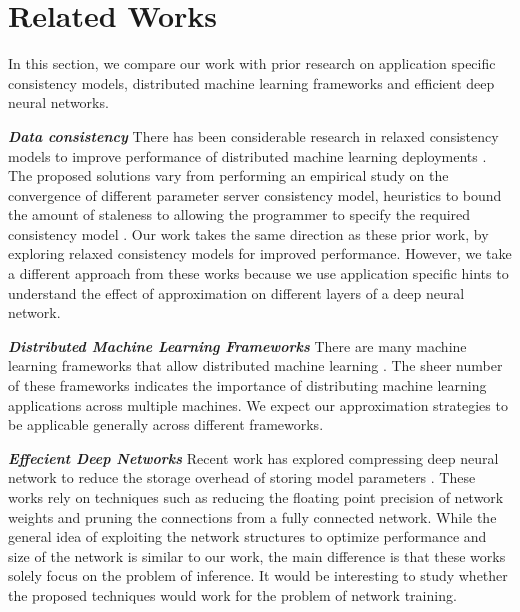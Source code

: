 \section{Related Works}

In this section, we compare our work with prior research
on application specific consistency models, distributed
machine learning frameworks and efficient deep neural networks.

\emph{\textbf{Data consistency}} There has been considerable
research in relaxed consistency models to improve performance
of distributed machine learning deployments \cite{ganger}\cite{stalesynchronousps}\cite{garth}\cite{parameterserver}.
The proposed solutions vary from performing an empirical study on the 
convergence of different parameter server consistency model\cite{garth}, 
heuristics to bound the amount of staleness \cite{ganger} to 
allowing the programmer to specify the required consistency model \cite{parameterserver}.
Our work takes the same direction as these prior work, by exploring
relaxed consistency models for improved performance. However, we take
a different approach from these works because we use application specific
hints to understand the effect of approximation on different layers of a 
deep neural network.

\emph{\textbf{Distributed Machine Learning Frameworks}} There are many
machine learning frameworks that allow distributed machine learning \cite{tensorflow}
\cite{parameterserver}\cite{distbelief}\cite{petuum}\cite{mxnet}. The sheer number
of these frameworks indicates the importance of distributing machine learning
applications across multiple machines. We expect our approximation strategies
to be applicable generally across different frameworks.

\emph{\textbf{Effecient Deep Networks}} Recent work has explored 
compressing deep neural network to reduce the storage overhead of storing 
model parameters \cite{compresseddnn}\cite{eie}\cite{compressedcnn}\cite{lecun}. These works rely on techniques
such as reducing the floating point precision of network weights and pruning
the connections from a fully connected network. While the general idea of 
exploiting the network structures to optimize performance and size of the network
is similar to our work, the main difference is that these works solely focus on 
the problem of inference. It would be interesting to study whether the proposed
techniques would work for the problem of network training.

 



